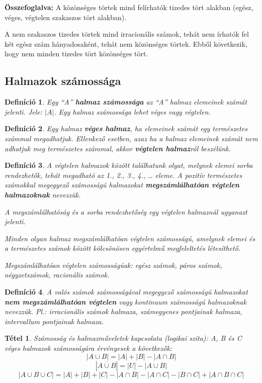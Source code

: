 \documentclass[12pt,a4paper]{article}
\newtheorem{theorem}{Tétel} [section]
\newtheorem{definition}{Definíció} [section]
\begin{document}
\textbf{Összefoglalva:}
A közönséges törtek mind felírhatók tizedes tört alakban (egész, véges, végtelen szakaszos tört alakban).

A nem szakaszos tizedes törtek mind irracionális számok, tehát nem írhatók fel két egész szám hányadosaként, tehát nem közönséges törtek. Ebből következik, hogy nem minden tizedes tört közönséges tört.

\subsection{Halmazok számossága}
\begin{definition}
Egy ``A'' \textbf{halmaz számossága} az ``A'' halmaz elemeinek számát jelenti. Jele: $|A|$. Egy halmaz számossága lehet véges vagy végtelen.
\end{definition}

\begin{definition}
Egy halmaz \textbf{véges halmaz}, ha elemeinek számát egy természetes számmal megadhatjuk. Ellenkező esetben, azaz ha a halmaz elemeinek számát nem adhatjuk meg természetes számmal, akkor \textbf{végtelen halmaz}ról beszélünk.
\end{definition}

\begin{definition}
A végtelen halmazok között találhatunk olyat, melynek elemei sorba rendezhetők, tehát megadható az 1., 2., 3., 4., … eleme. A pozitív természetes számokkal megegyező számosságú halmazokat \textbf{megszámlálhatóan végtelen halmazoknak} nevezzük.

A megszámlálhatóság és a sorba rendezhetőség egy végtelen halmaznál ugyanazt jelenti.

Minden olyan halmaz megszámlálhatóan végtelen számosságú, amelynek elemei és a természetes számok között kölcsönösen egyértelmű megfeleltetés létesíthető.

Megszámlálhatóan végtelen számosságúak: egész számok, páros számok, négyzetszámok, racionális számok.
\end{definition}

\begin{definition}
A valós számok számosságával megegyező számosságú halmazokat \textbf{nem megszámlálhatóan végtelen} vagy kontinuum számosságú halmazoknak nevezzük. Pl.: irracionális számok halmaza, számegyenes pontjainak halmaza, intervallum pontjainak halmaza.
\end{definition}

\begin{theorem}
Számosság és halmazműveletek kapcsolata (logikai szita): A, B és C véges halmazok számosságára érvényesek a következők:
$$|A\cup B| = |A| + |B|- |A\cap B|$$
$$\left|\overline{A\cup B}\right|=|U|-|A\cup B|$$
$$|A\cup B\cup C|=|A|+|B|+|C|-|A\cap B|-|A\cap C|-|B\cap C|+|A\cap B\cap C|$$
\end{theorem}
\end{document}
